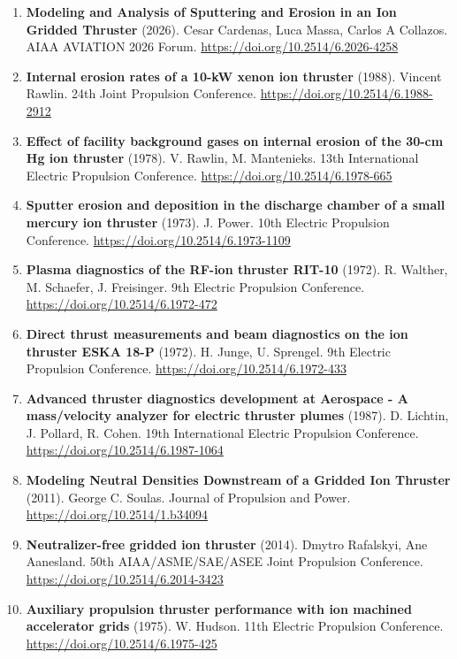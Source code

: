\documentclass[11pt,a4paper]{article}
\begin{document}
\begin{enumerate}[leftmargin=1.4em]
\item \textbf{Modeling and Analysis of Sputtering and Erosion in an Ion Gridded Thruster} (2026). Cesar Cardenas, Luca Massa, Carlos A Collazos. AIAA AVIATION 2026 Forum. \url{https://doi.org/10.2514/6.2026-4258}
\item \textbf{Internal erosion rates of a 10-kW xenon ion thruster} (1988). Vincent Rawlin. 24th Joint Propulsion Conference. \url{https://doi.org/10.2514/6.1988-2912}
\item \textbf{Effect of facility background gases on internal erosion of the 30-cm Hg ion thruster} (1978). V. Rawlin, M. Mantenieks. 13th International Electric Propulsion Conference. \url{https://doi.org/10.2514/6.1978-665}
\item \textbf{Sputter erosion and deposition in the discharge chamber of a small mercury ion thruster} (1973). J. Power. 10th Electric Propulsion Conference. \url{https://doi.org/10.2514/6.1973-1109}
\item \textbf{Plasma diagnostics of the RF-ion thruster RIT-10} (1972). R. Walther, M. Schaefer, J. Freisinger. 9th Electric Propulsion Conference. \url{https://doi.org/10.2514/6.1972-472}
\item \textbf{Direct thrust measurements and beam diagnostics on the ion thruster ESKA 18-P} (1972). H. Junge, U. Sprengel. 9th Electric Propulsion Conference. \url{https://doi.org/10.2514/6.1972-433}
\item \textbf{Advanced thruster diagnostics development at Aerospace - A mass/velocity analyzer for electric thruster plumes} (1987). D. Lichtin, J. Pollard, R. Cohen. 19th International Electric Propulsion Conference. \url{https://doi.org/10.2514/6.1987-1064}
\item \textbf{Modeling Neutral Densities Downstream of a Gridded Ion Thruster} (2011). George C. Soulas. Journal of Propulsion and Power. \url{https://doi.org/10.2514/1.b34094}
\item \textbf{Neutralizer-free gridded ion thruster} (2014). Dmytro Rafalskyi, Ane Aanesland. 50th AIAA/ASME/SAE/ASEE Joint Propulsion Conference. \url{https://doi.org/10.2514/6.2014-3423}
\item \textbf{Auxiliary propulsion thruster performance with ion machined accelerator grids} (1975). W. Hudson. 11th Electric Propulsion Conference. \url{https://doi.org/10.2514/6.1975-425}
\end{enumerate}
\end{document}
